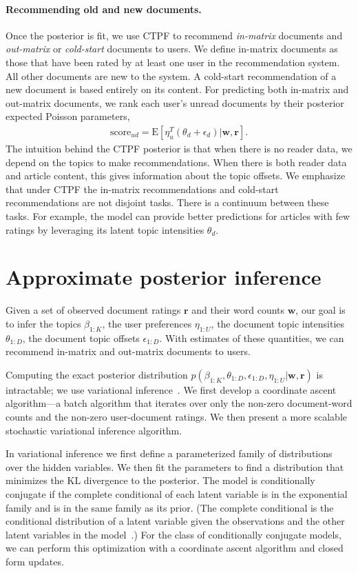 \documentclass{article}
\newcommand{\E}{\textrm{E}}
\begin{document}
\paragraph{Recommending old and new documents.}
Once the posterior is fit, we use CTPF to recommend \emph{in-matrix}
documents and \emph{out-matrix} or \emph{cold-start} documents to
users. We define in-matrix documents as those that have been rated by
at least one user in the recommendation system.  All other documents
are new to the system. A cold-start recommendation of a new document
is based entirely on its content. For predicting both in-matrix and
out-matrix documents, we rank each user's unread documents by their
posterior expected Poisson parameters,
\begin{align}
\text{score}_{ud} = \E [ \eta_u^T (\theta_d + \epsilon_d) | \bm{w}, \bm{r} ].
\end{align}
The intuition behind the CTPF posterior is that when there is no
reader data, we depend on the topics to make recommendations. When
there is both reader data and article content, this gives information
about the topic offsets. We emphasize that under CTPF the in-matrix
recommendations and cold-start recommendations are not disjoint
tasks. There is a continuum between these tasks. For example, the
model can provide better predictions for articles with few ratings by
leveraging its latent topic intensities $\theta_d$.


\section{Approximate posterior inference}
\label{sec:inference}
Given a set of observed document ratings $\bm{r}$ and their word
counts $\bm{w}$, our goal is to infer the topics $\beta_{1:K}$, the
user preferences $\eta_{1:U}$, the document topic intensities
$\theta_{1:D}$, the document topic offsets $\epsilon_{1:D}$. With
estimates of these quantities, we can recommend in-matrix and
out-matrix documents to users.

Computing the exact posterior distribution $p(\beta_{1:K},
\theta_{1:D}, \epsilon_{1:D}, \eta_{1:U} | \bm{w}, \bm{r})$ is
intractable; we use variational inference~\cite{Jordan:1999}. We first
develop a coordinate ascent algorithm---a batch algorithm that
iterates over only the non-zero document-word counts and the non-zero
user-document ratings. We then present a more scalable stochastic
variational inference algorithm.

In variational inference we first define a parameterized family of
distributions over the hidden variables. We then fit the parameters to
find a distribution that minimizes the KL divergence to the
posterior. The model is conditionally conjugate if the complete
conditional of each latent variable is in the exponential family and
is in the same family as its prior. (The complete conditional is the
conditional distribution of a latent variable given the observations
and the other latent variables in the model~\cite{Ghahramani:2000}.)
For the class of conditionally conjugate models, we can perform this
optimization with a coordinate ascent algorithm and closed form updates.
\end{document}
